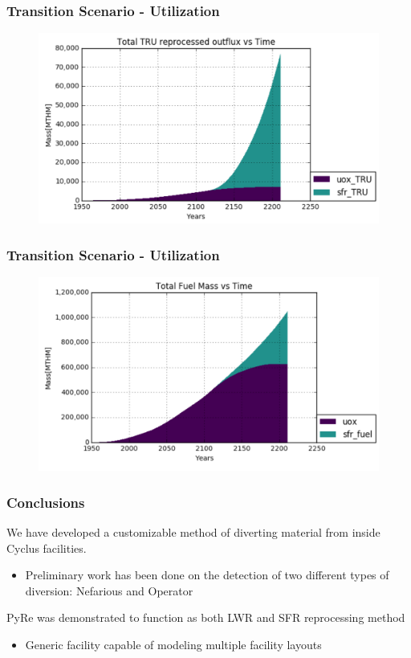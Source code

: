 \begin{frame}
\frametitle{Transition Scenario - Utilization}
\begin{figure}
	\includegraphics[width=\linewidth]{images/truutil}
\end{figure}
\end{frame}

\begin{frame}
\frametitle{Transition Scenario - Utilization}
\begin{figure}
	\includegraphics[width=\linewidth]{images/fuelmass}
\end{figure}
\end{frame}

\begin{frame}
\frametitle{Conclusions}
We have developed a customizable method of diverting material
from inside Cyclus facilities.
\begin{itemize}
	\item Preliminary work has been done on the detection of two
	different types of diversion: Nefarious and Operator
\end{itemize}
PyRe was demonstrated to function as both LWR and SFR
reprocessing method
\begin{itemize}
	\item Generic facility capable of modeling multiple facility layouts
\end{itemize}
\end{frame}